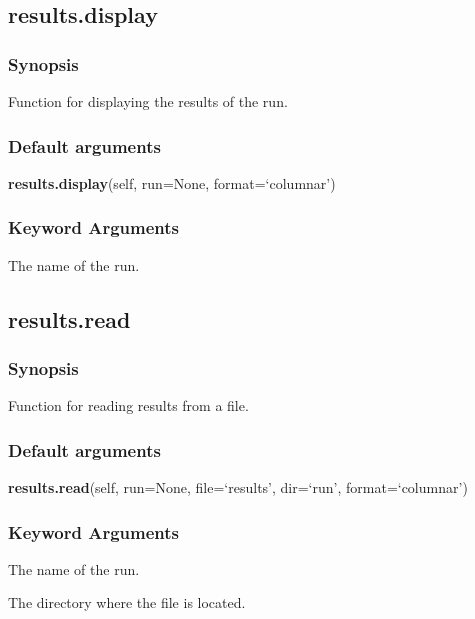 \newpage

\subsection{results.display}


\subsubsection{Synopsis}

Function for displaying the results of the run.

\subsubsection{Default arguments}

\textsf{\textbf{results.display}(self, run=None, format=`columnar')}


\subsubsection{Keyword Arguments}

  The name of the run.


\newpage

\subsection{results.read}


\subsubsection{Synopsis}

Function for reading results from a file.

\subsubsection{Default arguments}

\textsf{\textbf{results.read}(self, run=None, file=`results', dir=`run', format=`columnar')}


\subsubsection{Keyword Arguments}

  The name of the run.

  The directory where the file is located.


